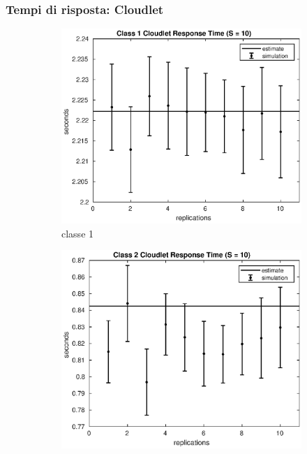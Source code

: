 \subsubsection{Tempi di risposta: Cloudlet}
%
\begin{figure}[!h]
\centering
%
\begin{subfigure}[t]{0.49\textwidth}
\includegraphics[width=\textwidth]{figures/simul/10_500K_s1clet}
\caption{classe 1}
\label{10_s1clet}
\end{subfigure}
%
\begin{subfigure}[t]{0.49\textwidth}
\includegraphics[width=\textwidth]{figures/simul/10_500K_s2clet}

\end{subfigure}
\end{figure}

